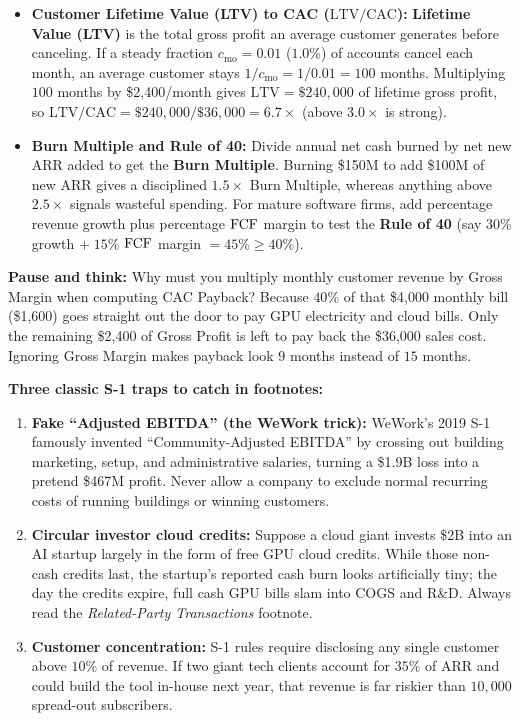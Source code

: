 \begin{itemize}
  \item \textbf{Customer Lifetime Value (LTV) to CAC ($\text{LTV} / \text{CAC}$):} \textbf{Lifetime Value (LTV)} is the total gross profit an average customer generates before canceling. If a steady fraction $c_{\text{mo}} = 0.01$ ($1.0\%$) of accounts cancel each month, an average customer stays $1 / c_{\text{mo}} = 1 / 0.01 = 100$ months. Multiplying $100$ months by \$2,400/month gives $\text{LTV} = \$240{,}000$ of lifetime gross profit, so $\text{LTV} / \text{CAC} = \$240{,}000 / \$36{,}000 = 6.7\times$ (above $3.0\times$ is strong).
  \item \textbf{Burn Multiple and Rule of 40:} Divide annual net cash burned by net new ARR added to get the \textbf{Burn Multiple}. Burning \$150M to add \$100M of new ARR gives a disciplined $1.5\times$ Burn Multiple, whereas anything above $2.5\times$ signals wasteful spending. For mature software firms, add percentage revenue growth plus percentage $\operatorname{FCF}$ margin to test the \textbf{Rule of 40} (say $30\%$ growth $+ \; 15\%$ $\operatorname{FCF}$ margin $= 45\% \ge 40\%$).
\end{itemize}

\begin{recoverybox}
\textbf{Pause and think:} Why must you multiply monthly customer revenue by Gross Margin when computing CAC Payback? Because $40\%$ of that \$4,000 monthly bill (\$1,600) goes straight out the door to pay GPU electricity and cloud bills. Only the remaining \$2,400 of Gross Profit is left to pay back the \$36,000 sales cost. Ignoring Gross Margin makes payback look $9$ months instead of $15$ months.
\end{recoverybox}

\begin{trapbox}
\textbf{Three classic S-1 traps to catch in footnotes:}
\begin{enumerate}
  \item \textbf{Fake ``Adjusted EBITDA'' (the WeWork trick):} WeWork's 2019 S-1 famously invented ``Community-Adjusted EBITDA'' by crossing out building marketing, setup, and administrative salaries, turning a \$1.9B loss into a pretend \$467M profit. Never allow a company to exclude normal recurring costs of running buildings or winning customers.
  \item \textbf{Circular investor cloud credits:} Suppose a cloud giant invests \$2B into an AI startup largely in the form of free GPU cloud credits. While those non-cash credits last, the startup's reported cash burn looks artificially tiny; the day the credits expire, full cash GPU bills slam into COGS and R\&D. Always read the \emph{Related-Party Transactions} footnote.
  \item \textbf{Customer concentration:} S-1 rules require disclosing any single customer above $10\%$ of revenue. If two giant tech clients account for $35\%$ of ARR and could build the tool in-house next year, that revenue is far riskier than $10{,}000$ spread-out subscribers.
\end{enumerate}
\end{trapbox}

